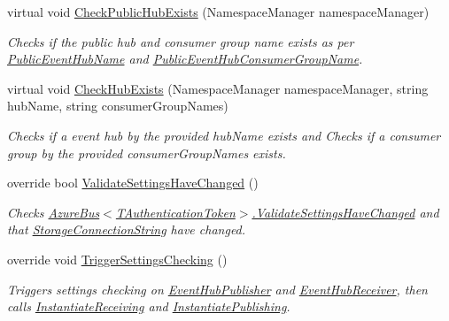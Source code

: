 \begin{DoxyCompactItemize}
virtual void \hyperlink{classCqrs_1_1Azure_1_1ServiceBus_1_1AzureEventHub_ae60a7cddcb566ff8f5cf2ac2db17733e_ae60a7cddcb566ff8f5cf2ac2db17733e}{Check\+Public\+Hub\+Exists} (Namespace\+Manager namespace\+Manager)
\begin{DoxyCompactList}\small\item\em Checks if the public hub and consumer group name exists as per \hyperlink{classCqrs_1_1Azure_1_1ServiceBus_1_1AzureEventHub_a6012f2290f9397929e9d6d5419963482_a6012f2290f9397929e9d6d5419963482}{Public\+Event\+Hub\+Name} and \hyperlink{classCqrs_1_1Azure_1_1ServiceBus_1_1AzureEventHub_a505c495eb73e4f888431d408e0b0d8ab_a505c495eb73e4f888431d408e0b0d8ab}{Public\+Event\+Hub\+Consumer\+Group\+Name}. \end{DoxyCompactList}\item 
virtual void \hyperlink{classCqrs_1_1Azure_1_1ServiceBus_1_1AzureEventHub_ac62e15208566056ffad05f46a303de8f_ac62e15208566056ffad05f46a303de8f}{Check\+Hub\+Exists} (Namespace\+Manager namespace\+Manager, string hub\+Name, string consumer\+Group\+Names)
\begin{DoxyCompactList}\small\item\em Checks if a event hub by the provided {\itshape hub\+Name}  exists and Checks if a consumer group by the provided {\itshape consumer\+Group\+Names}  exists. \end{DoxyCompactList}\item 
override bool \hyperlink{classCqrs_1_1Azure_1_1ServiceBus_1_1AzureEventHub_afe8d6f93f97ab5658b81903af555632c_afe8d6f93f97ab5658b81903af555632c}{Validate\+Settings\+Have\+Changed} ()
\begin{DoxyCompactList}\small\item\em Checks \hyperlink{classCqrs_1_1Azure_1_1ServiceBus_1_1AzureBus_a9fa1f5a74819100c40d8079ac6a6adb9_a9fa1f5a74819100c40d8079ac6a6adb9}{Azure\+Bus$<$\+T\+Authentication\+Token$>$.\+Validate\+Settings\+Have\+Changed} and that \hyperlink{classCqrs_1_1Azure_1_1ServiceBus_1_1AzureEventHub_a2b102538e8b72f9990578fa3bcbe4c12_a2b102538e8b72f9990578fa3bcbe4c12}{Storage\+Connection\+String} have changed. \end{DoxyCompactList}\item 
override void \hyperlink{classCqrs_1_1Azure_1_1ServiceBus_1_1AzureEventHub_a779ce1115cf00dfaf072056a6ad8f9fe_a779ce1115cf00dfaf072056a6ad8f9fe}{Trigger\+Settings\+Checking} ()
\begin{DoxyCompactList}\small\item\em Triggers settings checking on \hyperlink{classCqrs_1_1Azure_1_1ServiceBus_1_1AzureEventHub_a5f64ce36efaee0f676816c803620d05e_a5f64ce36efaee0f676816c803620d05e}{Event\+Hub\+Publisher} and \hyperlink{classCqrs_1_1Azure_1_1ServiceBus_1_1AzureEventHub_a1b12b47dbb9b9afe2014477a2e457c35_a1b12b47dbb9b9afe2014477a2e457c35}{Event\+Hub\+Receiver}, then calls \hyperlink{classCqrs_1_1Azure_1_1ServiceBus_1_1AzureEventHub_aa725781eddb65bdfe456a4fecb36fb6b_aa725781eddb65bdfe456a4fecb36fb6b}{Instantiate\+Receiving} and \hyperlink{classCqrs_1_1Azure_1_1ServiceBus_1_1AzureEventHub_a3747fb9fcb3de2a72c8a6d7bbd92db95_a3747fb9fcb3de2a72c8a6d7bbd92db95}{Instantiate\+Publishing}. \end{DoxyCompactList}\item 

\end{DoxyCompactItemize}
